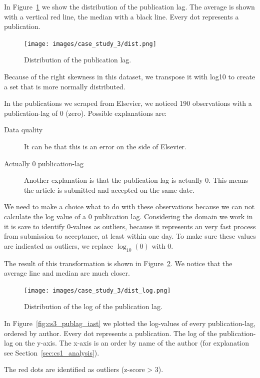 \documentclass{ou-report}
\begin{document}
In Figure~\ref{fig:publication_lag_dist} we show the distribution of the
publication lag. The average is shown with a vertical red line, the median with
a black line. Every dot represents a publication.

\begin{figure}[H]
    \centering
    \texttt{[image: images/case\_study\_3/dist.png]}
    \caption{Distribution of the publication lag.}
    \label{fig:publication_lag_dist}
\end{figure}

Because of the right skewness in this dataset, we transpose it with log10 to
create a set that is more normally distributed. 

In the publications we scraped from Elsevier, we noticed 190 observations with a
publication-lag of 0 (zero). Possible explanations are:
\begin{description}
    \item[Data quality] It can be that this is an error on the side of Elsevier.
    \item[Actually 0 publication-lag] Another explanation is that the
    publication lag is actually 0. This means the article is submitted and
    accepted on the same date. 
\end{description}
We need to make a choice what to do with these observations because we can not
calculate the log value of a 0 publication lag. Considering the domain we work
in it is
save to identify 0-values as outliers, because it represents an very fast
process from submission to acceptance, at least within one day.
To make sure these values are indicated as outliers, we replace $\log_{10} (0)$
with 0.

The result of this transformation is shown in
Figure~\ref{fig:publication_lag_dist_log}. We notice that the
average line and median are much closer.

\begin{figure}
    \centering
    \texttt{[image: images/case\_study\_3/dist\_log.png]}
    \caption{Distribution of the log of the publication lag.}
    \label{fig:publication_lag_dist_log}
\end{figure}

In Figure~\ref{fig:cs3_publag_iast} we plotted the log-values of every
publication-lag, ordered by author. Every dot represents a publication. The log
of the publication-lag on the y-axis. The x-axis is an order by name of the
author (for explanation see Section~\ref{sec:cs1_analysis}).

The red dots are identified as outliers (z-score > 3). 
\end{document}
